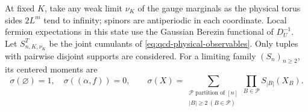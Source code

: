\documentclass[11pt,letterpaper,reqno]{amsart}
\theoremstyle{definition}
\theoremstyle{remark}
\begin{document}
At fixed $K$, take any weak limit $\nu_K$ of the gauge marginals
as the physical torus sides $2L^m$ tend to infinity; spinors are
antiperiodic in each coordinate. Local fermion expectations in this
state use the Gaussian Berezin functional of $D_U^{-1}$.
Let $S^T_{n,K,\nu_K}$ be the joint cumulants of
\eqref{eq:qcd-physical-observables}. Only tuples with pairwise
disjoint supports are considered. For a limiting family $(S_n)_{n\ge2}$,
its centered moments are
\begin{equation}\label{eq:qcd-centered-moments}
 \sigma(\varnothing)=1,\quad\sigma((\alpha,f))=0,\qquad
 \sigma(X)=\sum_{\substack{\mathcal P\text{ partition of }[n]\\
                       |B|\ge2\ (B\in\mathcal P)}}
                                \prod_{B\in\mathcal P}S_{|B|}(X_B).
\end{equation}
\end{document}
